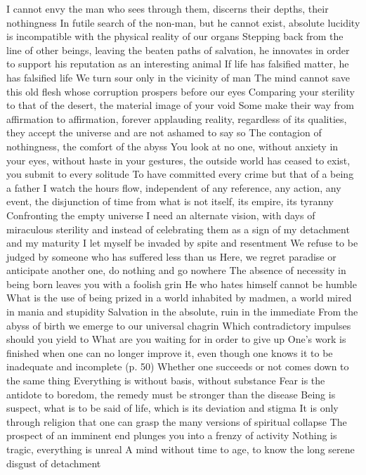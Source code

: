 \documentclass{article}
\begin{document}
I cannot envy the man who sees through them, discerns their depths, their nothingness
In futile search of the non-man, but he cannot exist, absolute lucidity is incompatible with the physical reality of our organs
Stepping back from the line of other beings, leaving the beaten paths of salvation, he innovates in order to support his reputation as an interesting animal
If life has falsified matter, he has falsified life
We turn sour only in the vicinity of man
The mind cannot save this old flesh whose corruption prospers before our eyes
Comparing your sterility to that of the desert, the material image of your void
Some make their way from affirmation to affirmation, forever applauding reality, regardless of its qualities, they accept the universe and are not ashamed to say so
The contagion of nothingness, the comfort of the abyss
You look at no one, without anxiety in your eyes, without haste in your gestures, the outside world has ceased to exist, you submit to every solitude
To have committed every crime but that of a being a father
I watch the hours flow, independent of any reference, any action, any event, the disjunction of time from what is not itself, its empire, its tyranny
Confronting the empty universe
I need an alternate vision, with days of miraculous sterility and instead of celebrating them as a sign of my detachment and my maturity
I let myself be invaded by spite and resentment
We refuse to be judged by someone who has suffered less than us
Here, we regret paradise or anticipate another one, do nothing and go nowhere
The absence of necessity in being born leaves you with a foolish grin
He who hates himself cannot be humble
What is the use of being prized in a world inhabited by madmen, a world mired in mania and stupidity
Salvation in the absolute, ruin in the immediate
From the abyss of birth we emerge to our universal chagrin
Which contradictory impulses should you yield to
What are you waiting for in order to give up
One's work is finished when one can no longer improve it, even though one knows it to be inadequate and incomplete (p. 50)
Whether one succeeds or not comes down to the same thing
Everything is without basis, without substance
Fear is the antidote to boredom, the remedy must be stronger than the disease
Being is suspect, what is to be said of life, which is its deviation and stigma
It is only through religion that one can grasp the many versions of spiritual collapse
The prospect of an imminent end plunges you into a frenzy of activity
Nothing is tragic, everything is unreal
A mind without time to age, to know the long serene disgust of detachment
\end{document}
